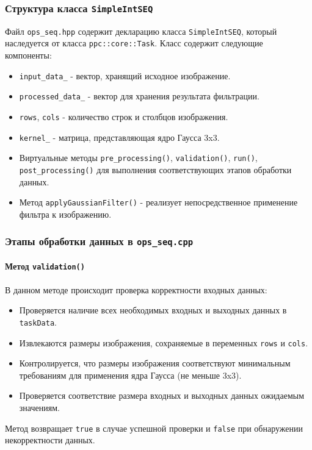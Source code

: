 \documentclass[12pt]{article}
\begin{document}
\subsubsection{Структура класса \texttt{SimpleIntSEQ}}

Файл \texttt{ops\_seq.hpp} содержит декларацию класса \texttt{SimpleIntSEQ}, который наследуется от класса \texttt{ppc::core::Task}. Класс содержит следующие компоненты:

\begin{itemize}
    \item \texttt{input\_data\_} - вектор, хранящий исходное изображение.
    \item \texttt{processed\_data\_} - вектор для хранения результата фильтрации.
    \item \texttt{rows}, \texttt{cols} - количество строк и столбцов изображения.
    \item \texttt{kernel\_} - матрица, представляющая ядро Гаусса 3x3.
    \item Виртуальные методы \texttt{pre\_processing()}, \texttt{validation()}, \texttt{run()}, \texttt{post\_processing()} для выполнения соответствующих этапов обработки данных.
    \item Метод \texttt{applyGaussianFilter()} - реализует непосредственное применение фильтра к изображению.
\end{itemize}

\subsubsection{Этапы обработки данных в \texttt{ops\_seq.cpp}}

\paragraph{Метод \texttt{validation()}}
В данном методе происходит проверка корректности входных данных:
\begin{itemize}
    \item Проверяется наличие всех необходимых входных и выходных данных в \texttt{taskData}.
    \item Извлекаются размеры изображения, сохраняемые в переменных \texttt{rows} и \texttt{cols}.
    \item Контролируется, что размеры изображения соответствуют минимальным требованиям для применения ядра Гаусса (не меньше 3x3).
    \item Проверяется соответствие размера входных и выходных данных ожидаемым значениям.
\end{itemize}
Метод возвращает \texttt{true} в случае успешной проверки и \texttt{false} при обнаружении некорректности данных.
\end{document}

